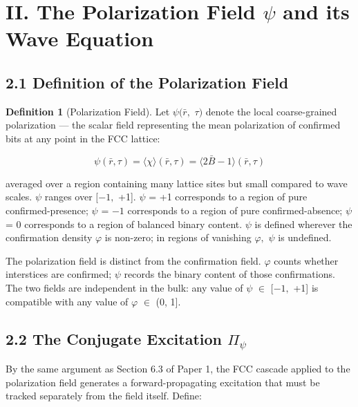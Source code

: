 \documentclass[11pt,oneside]{report}
\theoremstyle{definition}
\newtheorem{definition}[theorem]{Definition}
\theoremstyle{remark}
\begin{document}
\section*{II. The Polarization Field \ensuremath{\psi} and its Wave Equation}

\subsection*{2.1 Definition of the Polarization Field}

\begin{definition}[Polarization Field]
Let \ensuremath{\psi (\bar{r},} \ensuremath{\tau )} denote the local
coarse-grained polarization --- the scalar field representing the mean
polarization of confirmed bits at any point in the FCC lattice:
\end{definition}

\begin{equation*}
\psi (\bar{r}, \tau ) = \langle \chi \rangle (\bar{r}, \tau ) = \langle 2\bar{B} - 1\rangle (\bar{r}, \tau )
\end{equation*}

averaged over a region containing many lattice sites but small compared
to wave scales. \ensuremath{\psi} ranges over \ensuremath{[-1,} +1]. \ensuremath{\psi} = +1 corresponds to a
region of pure confirmed-presence; \ensuremath{\psi} = \ensuremath{-1} corresponds to a region of
pure confirmed-absence; \ensuremath{\psi} = 0 corresponds to a region of balanced binary
content. \ensuremath{\psi} is defined wherever the confirmation density \ensuremath{\varphi} is non-zero;
in regions of vanishing \ensuremath{\varphi ,} \ensuremath{\psi} is undefined.

The polarization field is distinct from the confirmation field. \ensuremath{\varphi} counts
whether interstices are confirmed; \ensuremath{\psi} records the binary content of those
confirmations. The two fields are independent in the bulk: any value of
\ensuremath{\psi} \ensuremath{\in} \ensuremath{[-1,} +1] is compatible with any value of \ensuremath{\varphi} \ensuremath{\in} (0, 1].

\subsection*{2.2 The Conjugate Excitation \ensuremath{\Pi_{\psi}}}

By the same argument as Section 6.3 of Paper 1, the FCC cascade applied
to the polarization field generates a forward-propagating excitation
that must be tracked separately from the field itself. Define:
\end{document}

